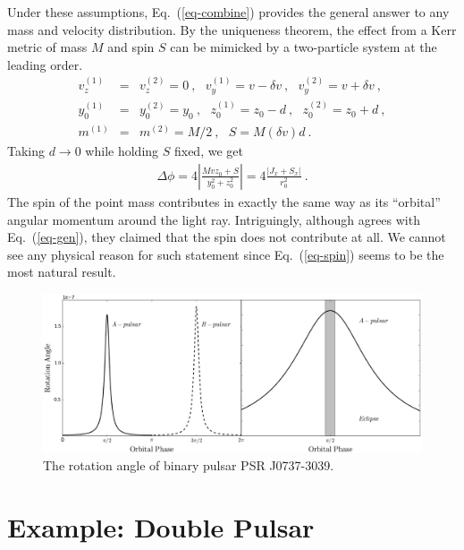\documentclass[aps,showpacs,onecolumn,floats,prd,superscriptaddress,nofootinbib]{revtex4}
\begin{document}
Under these assumptions, Eq.~(\ref{eq-combine}) provides the general answer to any mass and velocity distribution. 
By the uniqueness theorem, the effect from a Kerr metric of mass $M$ and spin $S$ can be mimicked by a two-particle system at the leading order.
\begin{eqnarray}
v_z^{(1)} &=& v_z^{(2)} = 0~,  \ \ \ v_y^{(1)} = v -\delta v~, \ \ \ v_y^{(2)} = v + \delta v~, \nonumber \\
y_0^{(1)} &=& y_0^{(2)} = y_0~, \ \ \ z_0^{(1)} = z_0-d~, \ \ \ z_0^{(2)} = z_0 + d~, \\
m^{(1)} &=& m^{(2)} = M/2~, \ \ \ S = M (\delta v) d~. \nonumber
\end{eqnarray}
Taking $d\rightarrow0$ while holding $S$ fixed, we get
\begin{eqnarray}
\Delta \phi = 4\left|\frac{Mvz_0 + S}{y_0^2 + z_0^2}\right| = 4 \frac{\left| J_x + S_x \right|}{r_0^2}~.
\label{eq-spin}
\end{eqnarray}
The spin of the point mass contributes in exactly the same way as its ``orbital'' angular momentum around the light ray. Intriguingly, although \cite{KopMas01} agrees with Eq.~(\ref{eq-gen}), they claimed that the spin does not contribute at all. We cannot see any physical reason for such statement since Eq.~(\ref{eq-spin}) seems to be the most natural result.



\begin{figure}
\includegraphics[width=\textwidth]{rotang.eps}
\caption{\label{fig:rotang}
The rotation angle of binary pulsar PSR J0737-3039.  }
\end{figure}







\section{Example: Double Pulsar}
\label{sec-prediction}
\end{document}
